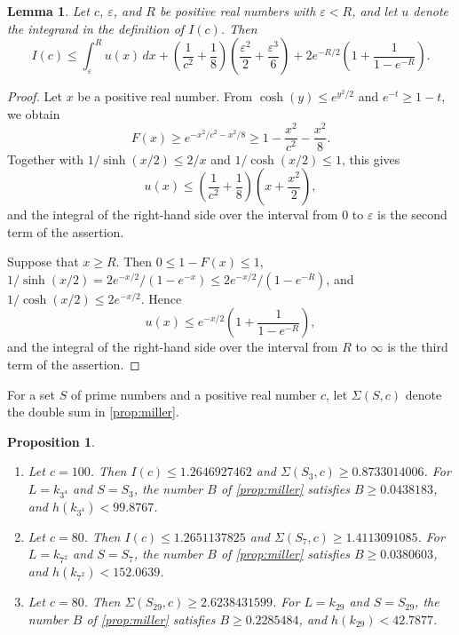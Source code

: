 \documentclass[11pt]{amsart}
\theoremstyle{plain}
\newtheorem{proposition}[theorem]{Proposition}
\newtheorem{lemma}[theorem]{Lemma}
\theoremstyle{definition}
\begin{document}
\begin{lemma} \label{lem:integral}
Let $c$, $\varepsilon$, and $R$ be positive real numbers with $\varepsilon < R$, and let $u$ denote the integrand in the definition of $I(c)$.
Then
\[
I(c) \le \int_\varepsilon^R u(x)\, dx + \left( \frac{1}{c^2} + \frac{1}{8} \right) \left( \frac{\varepsilon^2}{2} + \frac{\varepsilon^3}{6} \right) + 2 e^{-R/2} \left( 1 + \frac{1}{1 - e^{-R}} \right).
\]
\end{lemma}

\begin{proof}
Let $x$ be a positive real number.
From $\cosh(y) \le e^{y^2/2}$ and $e^{-t} \ge 1 - t$, we obtain
\[
F(x) \ge e^{-x^2/c^2 - x^2/8} \ge 1 - \frac{x^2}{c^2} - \frac{x^2}{8} .
\]
Together with $1/\sinh(x/2) \le 2/x$ and $1/\cosh(x/2) \le 1$, this gives
\[
u(x) \le \left( \frac{1}{c^2} + \frac{1}{8} \right) \left( x + \frac{x^2}{2} \right),
\]
and the integral of the right-hand side over the interval from $0$ to $\varepsilon$ is the second term of the assertion.

Suppose that $x \ge R$.
Then $0 \le 1 - F(x) \le 1$, $1/\sinh(x/2) = 2e^{-x/2}/(1 - e^{-x}) \le 2e^{-x/2}/(1 - e^{-R})$, and $1/\cosh(x/2) \le 2e^{-x/2}$.
Hence
\[
u(x) \le e^{-x/2} \left( 1 + \frac{1}{1 - e^{-R}} \right),
\]
and the integral of the right-hand side over the interval from $R$ to $\infty$ is the third term of the assertion.
\end{proof}

For a set $S$ of prime numbers and a positive real number $c$, let $\Sigma(S, c)$ denote the double sum in \cref{prop:miller}.

\begin{proposition} \label{prop:bound}
\begin{enumerate}
\item Let $c = 100$. Then $I(c) \le 1.2646927462$ and $\Sigma(S_3, c) \ge 0.8733014006$. For $L = k_{3^4}$ and $S = S_3$, the number $B$ of \cref{prop:miller} satisfies $B \ge 0.0438183$, and $h(k_{3^4}) < 99.8767$.
\item Let $c = 80$. Then $I(c) \le 1.2651137825$ and $\Sigma(S_7, c) \ge 1.4113091085$. For $L = k_{7^2}$ and $S = S_7$, the number $B$ of \cref{prop:miller} satisfies $B \ge 0.0380603$, and $h(k_{7^2}) < 152.0639$.
\item Let $c = 80$. Then $\Sigma(S_{29}, c) \ge 2.6238431599$. For $L = k_{29}$ and $S = S_{29}$, the number $B$ of \cref{prop:miller} satisfies $B \ge 0.2285484$, and $h(k_{29}) < 42.7877$.
\end{enumerate}
\end{proposition}
\end{document}

